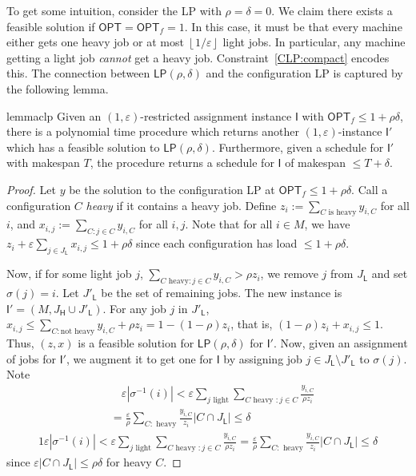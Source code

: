 \documentclass[11pt]{article}
\newcommand{\cardinal}[1]{\left|#1\right|}
\newcommand{\cI}{{\mathsf I}}
\newcommand{\sfH}{{\mathsf H}}
\newcommand{\sfL}{{\mathsf L}}
\newcommand{\eps}{\varepsilon}
\newcommand{\OPT}{{\mathsf{OPT}}}
\newcommand{\LP}{{\mathsf{LP}}}
\newcommand{\floor}[1]{\left\lfloor#1\right\rfloor}
\begin{document}
\medskip
To get some intuition, 
consider the LP with $\rho=\delta =  0$.
We claim there exists a  feasible solution if $\OPT = \OPT_f = 1$. In this case, it must be that every machine either gets one heavy job or 
at most $\floor{1/\eps}$ light jobs. In particular, any machine getting a light job {\em cannot} get a heavy job.
Constraint~\eqref{CLP:compact} encodes this. The connection between $\LP(\rho,\delta)$ and the configuration LP is captured by the following lemma.
\begin{restatable}{lemma}{clp}
\label{lemma:reduce-to-feasible-instances}
\label{lem:reduce-to-feasible-instances}
Given an $(1, \eps)$-restricted assignment instance $\cI$ with $\OPT_f\leq 1+\rho\delta$, there is a polynomial time procedure which 
returns another $(1,\eps)$-instance $\cI'$ which has a feasible solution to $\LP(\rho,\delta)$.
Furthermore, given a schedule for $\cI'$ with makespan $T$, the procedure returns a schedule for $\cI$ of makespan $\leq T+\delta$.
\end{restatable}

\begin{proof}
Let $y$ be the solution to the configuration LP at $\OPT_f \leq 1+\rho\delta$.
Call a configuration $C$ {\em heavy} if it contains a heavy job. Define
$z_i := \sum_{C\text{ is heavy}}y_{i,C}$ for all $i$, and $x_{i,j} := \sum_{C:j\in C} y_{i,C}$ for all $i,j$.
Note that  for all $i \in M$, we have 
$z_i + \eps\sum_{j\in J_\sfL} x_{i,j} \leq 1+\rho\delta$ since each configuration has load $\leq 1+\rho\delta$.

Now, if for some light job $j$, $\sum_{C \textrm{ heavy}:j\in C} y_{i,C}   > \rho z_i$, we remove $j$ from $J_\sfL$ and set $\sigma(j) = i$. 
Let $J'_\sfL$ be the set of remaining jobs. The new instance is $\cI' = (M,J_\sfH \cup J'_\sfL)$.
For any job $j$ in $J'_\sfL$, 
$x_{i,j} \leq  \sum_{C: \textrm{not heavy}} y_{i,C}  + \rho z_i  =   1 - (1-\rho)z_i$, that is, $(1-\rho)z_i + x_{i,j} \leq 1.$
Thus,  $(z,x)$ is a feasible solution for $\LP(\rho,\delta)$ for $\cI'$. Now, given an assignment of jobs for $\cI'$, we augment it to get one for $\cI$ by assigning job $j\in J_\sfL\setminus J'_\sfL$ to $\sigma(j)$.
Note
\ifdefined\CR
\begin{align*}
 &\quad \eps\cardinal{\sigma^{-1}(i)} < \eps\sum_{j\text{ light}} \sum_{C \textrm{ heavy }: j\in C}  \frac{y_{i,C}}{\rho z_i}\\
 &= \frac{\eps}{\rho} \sum_{C: \textrm{ heavy}} \frac{y_{i,C}}{z_i} \cardinal{C \cap J_\sfL} \leq \delta
\end{align*}
\else
\begin{alignat}{1}
 \eps\cardinal{\sigma^{-1}(i)} < \eps\sum_{j\text{ light}} \sum_{C \textrm{ heavy }: j\in C}  \frac{y_{i,C}}{\rho z_i} = \frac{\eps}{\rho} \sum_{C: \textrm{ heavy}} \frac{y_{i,C}}{z_i} \cardinal{C \cap J_\sfL} \leq \delta\nonumber
\end{alignat}
\fi
since $\eps\cardinal{C \cap J_\sfL}\leq \rho\delta$ for heavy $C$.
\end{proof}
\end{document}
